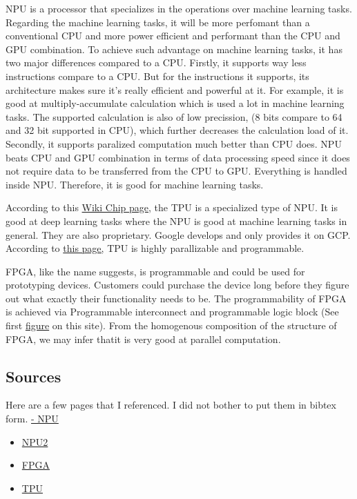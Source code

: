 \documentclass[11pt]{article}
\begin{document}
NPU is a processor that specializes in the operations over machine learning
tasks. Regarding the machine learning tasks, it will be more perfomant than a
conventional CPU and more power efficient and performant than the CPU and GPU
combination. To achieve such advantage on machine learning tasks, it has two
major differences compared to a CPU. Firstly, it supports way less instructions
compare to a CPU. But for the instructions it supports, its architecture makes
sure it's really efficient and powerful at it. For example, it is good at
multiply-accumulate calculation which is used a lot in machine learning tasks.
The supported calculation is also of low precission, (8 bits compare to 64 and
32 bit supported in CPU), which further decreases the calculation load of it.
Secondly, it supports paralized computation much better than CPU does. NPU
beats CPU and GPU combination in terms of data processing speed since it does
not require data to be transferred from the CPU to GPU. Everything is handled
inside NPU. Therefore, it is good for machine learning tasks.

According to this \href{https://en.wikichip.org/wiki/neural\_processor}{Wiki Chip page}, the TPU is a specialized type of NPU. It is
good at deep learning tasks where the NPU is good at machine learning tasks in
general. They are also proprietary. Google develops and only provides it on
GCP. According to \href{https://www.bizety.com/2023/01/03/ai-chips-npu-vs-tpu/}{this page,} TPU is highly parallizable and programmable.

FPGA, like the name suggests, is programmable and could be used for prototyping
devices. Customers could purchase the device long before they figure out what
exactly their functionality needs to be. The programmability of FPGA is
achieved via Programmable interconnect and programmable logic block (See first
\href{https://www.latticesemi.com/en/What-is-an-FPGA}{figure} on this site). From the homogenous composition of the structure of FPGA,
we may infer thatit is very good at parallel computation.

\subsection{Sources}
\label{sec:org6702018}
Here are a few pages that I referenced. I did not bother to put them in bibtex
form.
\href{https://en.wikichip.org/wiki/neural\_processor}{- NPU}
\begin{itemize}
\item \href{https://www.utmel.com/blog/categories/integrated\%20circuit/neural-processing-unit-npu-explained}{NPU2}
\item \href{https://www.arm.com/zh-TW/glossary/fpga}{FPGA}
\item \href{https://en.wikipedia.org/wiki/Tensor\_Processing\_Unit}{TPU}
\end{itemize}
\end{document}
